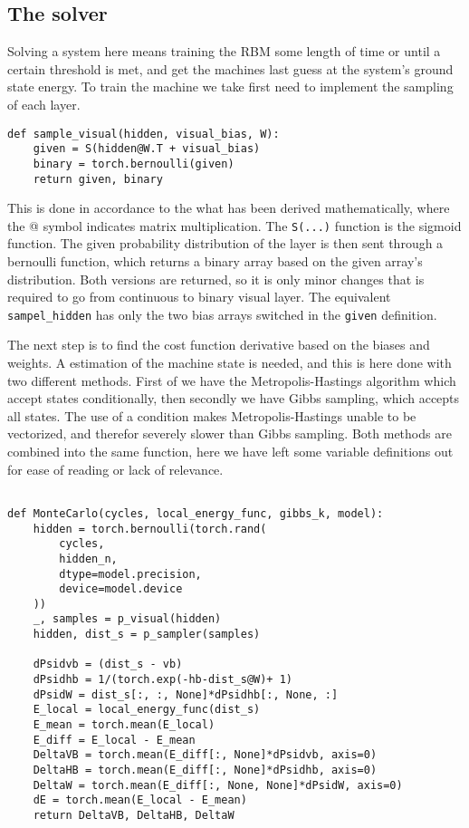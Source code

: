 \subsection{The solver}

Solving a system here means training the RBM some length of time or until a certain threshold is met, and get the machines last guess at the system's ground state energy. To train the machine we take first need to implement the sampling of each layer.

\begin{verbatim}
def sample_visual(hidden, visual_bias, W):
    given = S(hidden@W.T + visual_bias)
    binary = torch.bernoulli(given)
    return given, binary
\end{verbatim}

This is done in accordance to the what has been derived mathematically, where the @ symbol indicates matrix multiplication. The \texttt{S(...)} function is the sigmoid function. The given probability distribution of the layer is then sent through a bernoulli function, which returns a binary array based on the given array's distribution. Both versions are returned, so it is only minor changes that is required to go from continuous to binary visual layer. The equivalent \texttt{sampel_hidden} has only the two bias arrays switched in the \texttt{given} definition.

The next step is to find the cost function derivative based on the biases and weights. A estimation of the machine state is needed, and this is here done with two different methods. First of we have the Metropolis-Hastings algorithm which accept states conditionally, then secondly we have Gibbs sampling, which accepts all states. The use of a condition makes Metropolis-Hastings unable to be vectorized, and therefor severely slower than Gibbs sampling. Both methods are combined into the same function, here we have left some variable definitions out for ease of reading or lack of relevance.

\begin{verbatim}

def MonteCarlo(cycles, local_energy_func, gibbs_k, model):
    hidden = torch.bernoulli(torch.rand(
        cycles, 
        hidden_n, 
        dtype=model.precision, 
        device=model.device
    ))
    _, samples = p_visual(hidden)
    hidden, dist_s = p_sampler(samples)
    
    dPsidvb = (dist_s - vb)
    dPsidhb = 1/(torch.exp(-hb-dist_s@W)+ 1)
    dPsidW = dist_s[:, :, None]*dPsidhb[:, None, :]
    E_local = local_energy_func(dist_s)
    E_mean = torch.mean(E_local)
    E_diff = E_local - E_mean
    DeltaVB = torch.mean(E_diff[:, None]*dPsidvb, axis=0)
    DeltaHB = torch.mean(E_diff[:, None]*dPsidhb, axis=0)
    DeltaW = torch.mean(E_diff[:, None, None]*dPsidW, axis=0)
    dE = torch.mean(E_local - E_mean)      
    return DeltaVB, DeltaHB, DeltaW

\end{verbatim}

